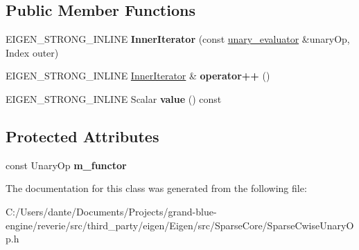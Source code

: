 \subsection*{Public Member Functions}
\begin{DoxyCompactItemize}
\item 
\mbox{\label{class_eigen_1_1internal_1_1unary__evaluator_3_01_cwise_unary_op_3_01_unary_op_00_01_arg_type_01_629bdbe0b310981fdaf6bb6b6c73ef55_a549767003aa22c3238af8b8f107927c0}} 
E\+I\+G\+E\+N\+\_\+\+S\+T\+R\+O\+N\+G\+\_\+\+I\+N\+L\+I\+NE {\bfseries Inner\+Iterator} (const \mbox{\hyperlink{struct_eigen_1_1internal_1_1unary__evaluator}{unary\+\_\+evaluator}} \&unary\+Op, Index outer)
\item 
\mbox{\label{class_eigen_1_1internal_1_1unary__evaluator_3_01_cwise_unary_op_3_01_unary_op_00_01_arg_type_01_629bdbe0b310981fdaf6bb6b6c73ef55_a2778c397f9270dd82c3f204e61bc5453}} 
E\+I\+G\+E\+N\+\_\+\+S\+T\+R\+O\+N\+G\+\_\+\+I\+N\+L\+I\+NE \mbox{\hyperlink{class_eigen_1_1_inner_iterator}{Inner\+Iterator}} \& {\bfseries operator++} ()
\item 
\mbox{\label{class_eigen_1_1internal_1_1unary__evaluator_3_01_cwise_unary_op_3_01_unary_op_00_01_arg_type_01_629bdbe0b310981fdaf6bb6b6c73ef55_ab61e1be0a86389334383f9ae27e20340}} 
E\+I\+G\+E\+N\+\_\+\+S\+T\+R\+O\+N\+G\+\_\+\+I\+N\+L\+I\+NE Scalar {\bfseries value} () const
\end{DoxyCompactItemize}
\subsection*{Protected Attributes}
\begin{DoxyCompactItemize}
\item 
\mbox{\label{class_eigen_1_1internal_1_1unary__evaluator_3_01_cwise_unary_op_3_01_unary_op_00_01_arg_type_01_629bdbe0b310981fdaf6bb6b6c73ef55_a4521f30e3af712fa6d439c515d8ba3d6}} 
const Unary\+Op {\bfseries m\+\_\+functor}
\end{DoxyCompactItemize}


The documentation for this class was generated from the following file\+:\begin{DoxyCompactItemize}
\item 
C\+:/\+Users/dante/\+Documents/\+Projects/grand-\/blue-\/engine/reverie/src/third\+\_\+party/eigen/\+Eigen/src/\+Sparse\+Core/Sparse\+Cwise\+Unary\+Op.\+h\end{DoxyCompactItemize}
